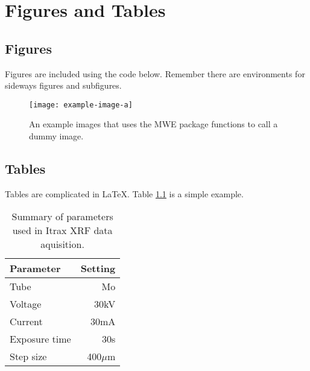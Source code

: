 \chapter{Figures and Tables}
\section{Figures}
Figures are included using the code below. Remember there are environments for sideways figures and subfigures. 

\begin{figure}[tbp]
	\centering
		\texttt{[image: example-image-a]}
	\caption[Example image.]{An example images that uses the MWE package functions to call a dummy image.}
	\label{fig:editapic}
\end{figure}

\section{Tables}
Tables are complicated in \LaTeX. Table \ref{tab:itraxsetupsummary} is a simple example.

\begin{table}[tbp]
	\centering
		\begin{tabular}{lr}
		 \hline
		 Parameter     & Setting       \\ \hline
		 Tube          & Mo            \\
		 Voltage       & 30kV          \\
		 Current       & 30mA          \\
	   Exposure time & 30s           \\
		 Step size     & 400$\mu$m     \\
		 \hline			
		\end{tabular}
	\caption[Summary of parameters used in Itrax XRF data aquisition.]{Summary of parameters used in Itrax XRF data aquisition.}
	\label{tab:itraxsetupsummary}
\end{table}